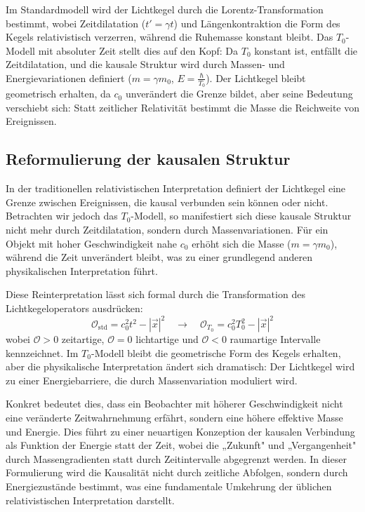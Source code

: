 \documentclass[a4paper,12pt]{article}
\begin{document}
			Im Standardmodell wird der Lichtkegel durch die Lorentz-Transformation bestimmt, wobei Zeitdilatation (\( t' = \gamma t \)) und Längenkontraktion die Form des Kegels relativistisch verzerren, während die Ruhemasse konstant bleibt. Das \( T_0 \)-Modell mit absoluter Zeit stellt dies auf den Kopf: Da \( T_0 \) konstant ist, entfällt die Zeitdilatation, und die kausale Struktur wird durch Massen- und Energievariationen definiert (\( m = \gamma m_0 \), \( E = \frac{\hbar}{T_0} \)). Der Lichtkegel bleibt geometrisch erhalten, da \( c_0 \) unverändert die Grenze bildet, aber seine Bedeutung verschiebt sich: Statt zeitlicher Relativität bestimmt die Masse die Reichweite von Ereignissen.
			
			\subsection{Reformulierung der kausalen Struktur}
			In der traditionellen relativistischen Interpretation definiert der Lichtkegel eine Grenze zwischen Ereignissen, die kausal verbunden sein können oder nicht. Betrachten wir jedoch das \( T_0 \)-Modell, so manifestiert sich diese kausale Struktur nicht mehr durch Zeitdilatation, sondern durch Massenvariationen. Für ein Objekt mit hoher Geschwindigkeit nahe \( c_0 \) erhöht sich die Masse (\( m = \gamma m_0 \)), während die Zeit unverändert bleibt, was zu einer grundlegend anderen physikalischen Interpretation führt.
			
			Diese Reinterpretation lässt sich formal durch die Transformation des Lichtkegeloperators ausdrücken:
			\begin{equation}
			\mathcal{O}_{\text{std}} = c_0^2 t^2 - |\vec{x}|^2 \quad \rightarrow \quad \mathcal{O}_{T_0} = c_0^2 T_0^2 - |\vec{x}|^2
			\end{equation}
			wobei \( \mathcal{O} > 0 \) zeitartige, \( \mathcal{O} = 0 \) lichtartige und \( \mathcal{O} < 0 \) raumartige Intervalle kennzeichnet. Im \( T_0 \)-Modell bleibt die geometrische Form des Kegels erhalten, aber die physikalische Interpretation ändert sich dramatisch: Der Lichtkegel wird zu einer Energiebarriere, die durch Massenvariation moduliert wird.
			
			Konkret bedeutet dies, dass ein Beobachter mit höherer Geschwindigkeit nicht eine veränderte Zeitwahrnehmung erfährt, sondern eine höhere effektive Masse und Energie. Dies führt zu einer neuartigen Konzeption der kausalen Verbindung als Funktion der Energie statt der Zeit, wobei die „Zukunft" und „Vergangenheit" durch Massengradienten statt durch Zeitintervalle abgegrenzt werden. In dieser Formulierung wird die Kausalität nicht durch zeitliche Abfolgen, sondern durch Energiezustände bestimmt, was eine fundamentale Umkehrung der üblichen relativistischen Interpretation darstellt.
			
\end{document}
